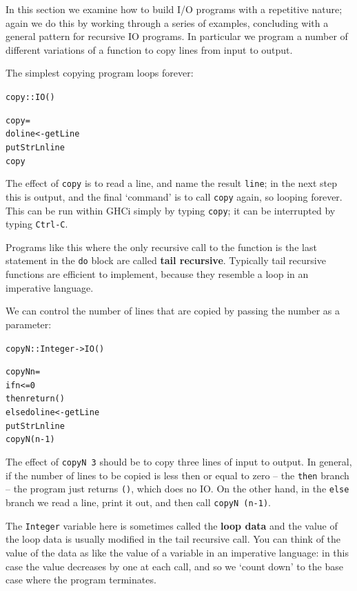 In this section we examine how to build I/O programs with a repetitive
nature; again we do this by working through a series of examples, concluding with a general pattern for recursive IO programs. 
In particular we program a number of different variations of a function to copy lines from input to output.

\begin{example}

 The simplest copying program loops forever:
\begin{alltt}
copy :: IO ()

copy =
    do line <- getLine 
       putStrLn line
       copy
\end{alltt}
The effect of \texttt{copy} is to read a line, and name the result \texttt{line}; in the next step this is output, and the final `command' is to call \texttt{copy} again, so looping forever. This can be run within GHCi simply by typing \texttt{copy}; it can be interrupted by typing \texttt{Ctrl-C}. 

Programs like this where the only recursive call to the function is the last statement in the \texttt{do} block are called \textbf{tail recursive}. Typically tail recursive functions are efficient to implement, because they resemble a loop in an imperative language.

 We can control the number of lines that are copied by passing the number as a parameter:
\begin{alltt}
copyN :: Integer -> IO ()

copyN n =
    if n <= 0
    then return ()
    else do line <- getLine
            putStrLn line
            copyN (n-1)
\end{alltt}
The effect of \texttt{copyN 3} should be to copy three lines of input to output. In general, if the number of lines to be copied is less then or equal to zero -- the \texttt{then} branch -- the program just returns \texttt{()}, which does no IO. On the other hand, in the \texttt{else} branch we read a line, print it out, and then call \texttt{copyN (n-1)}.

The \texttt{Integer} variable here is sometimes called the \textbf{loop data} and the value of the loop data is usually modified in the tail recursive call. You can think of the value of the data as like the value of a variable in an imperative language: in this case the value decreases by one at each call, and so we `count down' to the base case where the program terminates.


\end{example}
